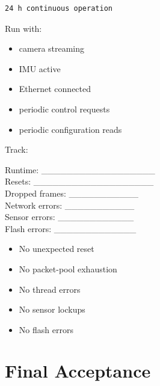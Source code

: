 \documentclass[10pt,a4paper,oneside]{report}
\providecommand{\tightlist}{\setlength{\itemsep}{1pt}\setlength{\parskip}{1pt}}
\begin{document}
\begin{verbatim}
24 h continuous operation
\end{verbatim}

Run with:

\begin{itemize}
\tightlist
\item
  camera streaming
\item
  IMU active
\item
  Ethernet connected
\item
  periodic control requests
\item
  periodic configuration reads
\end{itemize}

Track:

Runtime: \_\_\_\_\_\_\_\_\_\_\_\_\_\_\_\_\_\_\\
Resets: \_\_\_\_\_\_\_\_\_\_\_\_\_\_\_\_\_\_\_\\
Dropped frames: \_\_\_\_\_\_\_\_\_\_\_\\
Network errors: \_\_\_\_\_\_\_\_\_\_\_\\
Sensor errors: \_\_\_\_\_\_\_\_\_\_\_\_\\
Flash errors: \_\_\_\_\_\_\_\_\_\_\_\_\_

\begin{itemize}
\tightlist
\item[$\square$]
  No unexpected reset
\item[$\square$]
  No packet-pool exhaustion
\item[$\square$]
  No thread errors
\item[$\square$]
  No sensor lockups
\item[$\square$]
  No flash errors
\end{itemize}

\section{Final Acceptance}\label{wiki-hardware-bring-up-and-testing--24-final-acceptance}
\end{document}
